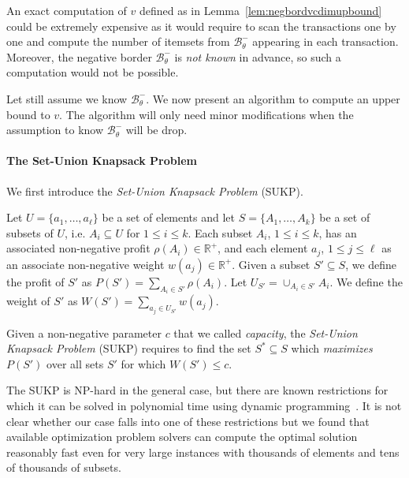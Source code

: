 An exact computation of $v$ defined as in Lemma~\ref{lem:negbordvcdimupbound} could
be extremely expensive as it would require to scan the transactions one by one
and compute the number of itemsets from $\mathcal{B}^-_\theta$ appearing in each
transaction. Moreover, the negative border $\mathcal{B}^-_\theta$ is \emph{not
known} in advance, so such a computation would not be possible. 

Let still assume we know $\mathcal{B}^-_\theta$. We now present an algorithm to
compute an upper bound to $v$. The algorithm will only need minor modifications
when the assumption to know $\mathcal{B}^-_\theta$ will be drop.

\paragraph{The Set-Union Knapsack Problem}
We first introduce the \emph{Set-Union Knapsack Problem} (SUKP). 
\begin{definition}\label{def:sukp}
  Let $U=\{a_1,\dotsc,a_\ell\}$ be a set of elements and let
  $S=\{A_1,\dotsc,A_k\}$ be a set of subsets of $U$, i.e. $A_i\subseteq U$ for
  $1\le i\le k$. Each subset $A_i$, $1\le i\le k$, has an associated
  non-negative profit $\rho(A_i)\in\mathbb{R}^+$, and each element $a_j$, $1\le
  j\le\ell$ as an associate non-negative weight $w(a_j)\in\mathbb{R}^+$.
  Given a subset $S'\subseteq S$, we define the profit of $S'$ as
  $P(S')=\sum_{A_i\in S'}\rho(A_i)$. Let $U_{S'}=\cup_{A_i\in S'} A_i$. We
  define the weight of $S'$ as $W(S')=\sum_{a_j\in U_{S'}} w(a_j)$. 

  Given a non-negative parameter $c$ that we called \emph{capacity}, the
  \emph{Set-Union Knapsack Problem} (SUKP) requires to find the
  set $S^*\subseteq S$ which \emph{maximizes} $P(S')$ over all sets $S'$ for
  which $W(S')\le c$.
\end{definition}
The SUKP is NP-hard in the general case, but there are known restrictions for
which it can be solved in polynomial time using dynamic
programming~\citep{GoldschmidtNY94}. It is not clear whether our case falls into
one of these restrictions but we found that available optimization problem
solvers can compute the optimal solution reasonably fast even for very large
instances with thousands of elements and tens of thousands of subsets.


